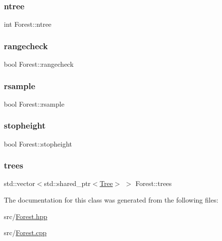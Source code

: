\mbox{\label{classForest_a63aab05561b82d08972ee8fe455c45cc}} 
\subsubsection{\texorpdfstring{ntree}{ntree}}
{\footnotesize\ttfamily int Forest\+::ntree}

\mbox{\label{classForest_a590efbd7b01fa3fdb023d10df3d9792b}} 
\subsubsection{\texorpdfstring{rangecheck}{rangecheck}}
{\footnotesize\ttfamily bool Forest\+::rangecheck}

\mbox{\label{classForest_a64b54558dfe88223f0521443c0b34b17}} 
\subsubsection{\texorpdfstring{rsample}{rsample}}
{\footnotesize\ttfamily bool Forest\+::rsample}

\mbox{\label{classForest_a066998b292bc6c764b7244830f027631}} 
\subsubsection{\texorpdfstring{stopheight}{stopheight}}
{\footnotesize\ttfamily bool Forest\+::stopheight}

\mbox{\label{classForest_acbfc6b953ce79295ecc9646fdb52e917}} 
\subsubsection{\texorpdfstring{trees}{trees}}
{\footnotesize\ttfamily std\+::vector$<$std\+::shared\+\_\+ptr$<$\hyperlink{classTree}{Tree}$>$ $>$ Forest\+::trees}



The documentation for this class was generated from the following files\+:\begin{DoxyCompactItemize}
\item 
src/\hyperlink{Forest_8hpp}{Forest.\+hpp}\item 
src/\hyperlink{Forest_8cpp}{Forest.\+cpp}\end{DoxyCompactItemize}
